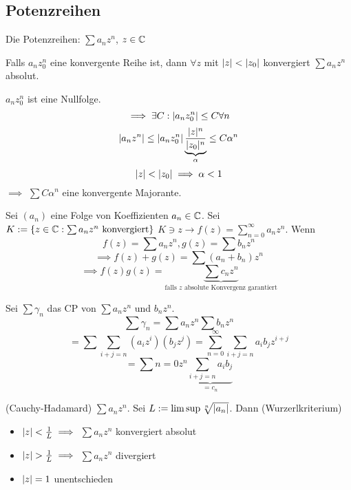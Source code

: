 \subsection{Potenzreihen}
\begin{Def}
  Die Potenzreihen: $\sum a_nz^n$, $z\in\mathbb{C}$
\end{Def}
\begin{Lem}
  Falls $a_nz_0^n$ eine konvergente Reihe ist, dann $\forall z$ mit $\mathopen| z \mathclose|<\mathopen| z_0 \mathclose|$ konvergiert $\sum a_nz^n$ absolut.
\end{Lem}
\begin{Bew}
  $a_nz_0^n$ ist eine Nullfolge.
  \[\implies \exists C:\mathopen| a_nz_0^n \mathclose|\leq C\forall n\]
  \[\mathopen| a_nz^n \mathclose|\leq\mathopen| a_nz^n_0 \mathclose|\underbrace{\frac{\mathopen| z \mathclose|^n}{\mathopen| z_0 \mathclose|^n}}_\alpha\leq C\alpha^n\]
  \[\mathopen| z \mathclose|<\mathopen| z_0 \mathclose|\implies \alpha<1\]
  $\implies$ $\sum C\alpha^n$ eine konvergente Majorante.
\end{Bew}
\begin{Sat}
  Sei $(a_n)$ eine Folge von Koeffizienten $a_n\in\mathbb{C}$. Sei $K:=\left\{ z\in\mathbb{C}:\sum a_nz^n\text{ konvergiert} \right\}$ $K\ni z\to f(z)=\sum^\infty_{n=0}a_nz^n$. Wenn
  \[f(z)=\sum a_nz^n, g(z)=\sum b_nz^n\]
  \[\implies f(z)+g(z)=\sum(a_n+b_n)z^n\]
  \[\implies f(z)g(z)=\underbrace{\sum c_nz^n}_{\text{falls $z$ absolute Konvergenz garantiert}}\]
\end{Sat}
\begin{Bew}
  Sei $\sum \gamma_n$ das CP von $\sum a_nz^n$ und $b_nz^n$.
  \[\sum\gamma_n=\sum a_nz^n\sum b_nz^n\]
  \[=\sum\sum_{i+j=n}\left( a_iz^i \right)\left( b_jz^j \right)=\sum^\infty_{n=0}\sum_{i+j=n}a_ib_jz^{i+j}\]
  \[=\sum {n=0}z^n\underbrace{\sum_{i+j=n}a_ib_j}_{=c_n}\]
\end{Bew}
\begin{Sat}
  (Cauchy-Hadamard) $\sum a_nz^n$. Sei $L:=\limsup \sqrt[n]{\mathopen| a_n \mathclose|}$. Dann (Wurzerlkriterium)
  \begin{itemize}
    \item $\mathopen| z \mathclose|<\frac{1}{L}\implies$ $\sum a_nz^n$ konvergiert absolut
    \item $\abs{z}>\frac{1}{L}\implies$ $\sum a_nz^n$ divergiert
    \item $\mathopen| z \mathclose|=1$ unentschieden
  \end{itemize}
\end{Sat}
